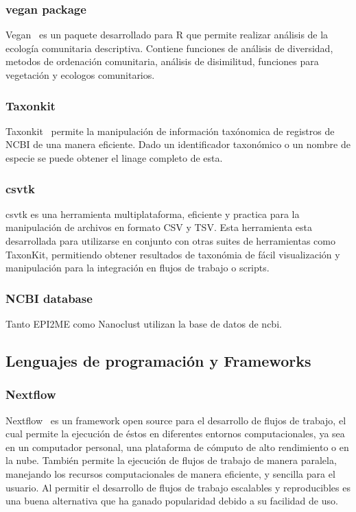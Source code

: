 \subsubsection{vegan package}
Vegan~\cite{dixon2003vegan} es un paquete desarrollado para R que permite realizar análisis de la ecología comunitaria descriptiva. Contiene funciones de análisis de diversidad,  metodos de ordenación comunitaria, análisis de disimilitud, funciones para vegetación y ecologos comunitarios.



\subsubsection{Taxonkit}
Taxonkit~\cite{SHEN2021844} permite la manipulación de información taxónomica de registros de NCBI de una manera eficiente. Dado un identificador taxonómico o un nombre de especie se puede obtener el linage completo de esta.

\subsubsection{csvtk}
csvtk es una herramienta multiplataforma, eficiente y practica para la manipulación de archivos en formato CSV y TSV. Esta herramienta esta desarrollada para utilizarse en conjunto con otras suites de herramientas como TaxonKit, permitiendo obtener resultados de taxonómia de fácil visualización y manipulación para la integración en flujos de trabajo o scripts.
\subsubsection{NCBI database}
Tanto EPI2ME como Nanoclust utilizan la base de datos de ncbi.
\subsection{Lenguajes de programación y Frameworks}
\subsubsection{Nextflow}
Nextflow~\cite{di2017nextflow} es un framework open source para el desarrollo de flujos de trabajo, el cual permite la ejecución de éstos en diferentes entornos computacionales, ya sea en un computador personal, una plataforma de cómputo de alto rendimiento o en la nube. También permite la ejecución de flujos de trabajo de manera paralela, manejando los recursos computacionales de manera eficiente, y sencilla para el usuario.
 Al permitir el desarrollo de flujos de trabajo escalables y reproducibles es una buena alternativa que ha ganado popularidad debido a su facilidad de uso.

